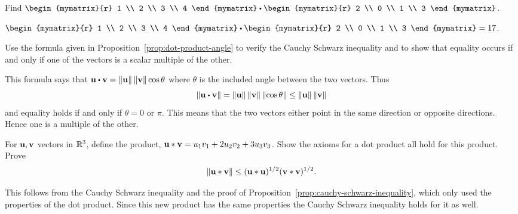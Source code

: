 
\begin{ex} Find $\begin{mymatrix}{r}
1 \\
2 \\
3 \\
4
\end{mymatrix} \dotprod \begin{mymatrix}{r}
2 \\
0 \\
1 \\
3
\end{mymatrix}$.
\begin{sol}
$\begin{mymatrix}{r}
1 \\
2 \\
3 \\
4
\end{mymatrix} \dotprod \begin{mymatrix}{r}
2 \\
0 \\
1 \\
3
\end{mymatrix} = 17$.
\end{sol}
\end{ex}

\begin{ex} Use the formula given in Proposition~\ref{prop:dot-product-angle} to verify the Cauchy Schwarz inequality and
to show that equality occurs if and only if one of the vectors is a scalar
multiple of the other.
\begin{sol}
This formula says that $\vect{u}\dotprod \vect{v}=\norm{
\vect{u}} \norm{\vect{v}} \cos \theta $ where $
\theta $ is the included angle between the two vectors. Thus
\begin{equation*}
\norm{\vect{u}\dotprod \vect{v}} =\norm{\vect{u}}
\norm{\vect{v}} \norm{\cos \theta} \leq
\norm{\vect{u}} \norm{\vect{v}}
\end{equation*}
and equality holds if and only if $\theta =0$ or $\pi$. This means that the
two vectors either point in the same direction or opposite directions. Hence
one is a multiple of the other.
\end{sol}
\end{ex}

\begin{ex} For $\vect{u},\vect{v}$ vectors in $\mathbb{R}^{3}$, define the product,
$\vect{u}\ast \vect{v} =  u_{1}v_{1}+2u_{2}v_{2}+3u_{3}v_{3}$. Show the axioms
for a dot product all hold for this product. Prove
\begin{equation*}
\norm{\vect{u}\ast \vect{v}} \leq (\vect{u}\ast \vect{u})
^{1/2}(\vect{v}\ast \vect{v}) ^{1/2}.
\end{equation*}
\begin{sol}
  This follows from the Cauchy Schwarz inequality and the proof of
  Proposition~\ref{prop:cauchy-schwarz-inequality}, which only used the
  properties of the dot product. Since this new product has the same
  properties the Cauchy Schwarz inequality holds for it as well.
\end{sol}
\end{ex}


